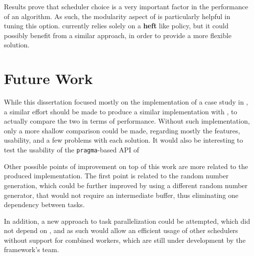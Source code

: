 \documentclass[main.tex]{subfiles}
\begin{document}
Results prove that scheduler choice is a very important factor in the performance of an algorithm. As such, the modularity aspect of \starpu is particularly helpful in tuning this option. \gama currently relies solely on a \textbf{heft} like policy, but it could possibly benefit from a similar approach, in order to provide a more flexible solution.



\section{Future Work} \label{chapter:future}

While this dissertation focused mostly on the implementation of a case study in \starpu, a similar effort should be made to produce a similar implementation with \gama, to actually compare the two in terms of performance. Without such implementation, only a more shallow comparison could be made, regarding mostly the features, usability, and a few problems with each solution.
It would also be interesting to test the usability of the \texttt{pragma}-based API of \starpu

Other possible points of improvement on top of this work are more related to the produced implementation. The first point is related to the random number generation, which could be further improved by using a different random number generator, that would not require an intermediate buffer, thus eliminating one dependency between tasks.

In addition, a new approach to task parallelization could be attempted, which did not depend on \openmp, and as such would allow an efficient usage of other \starpu schedulers without support for combined workers, which are still under development by the framework's team.
\end{document}
